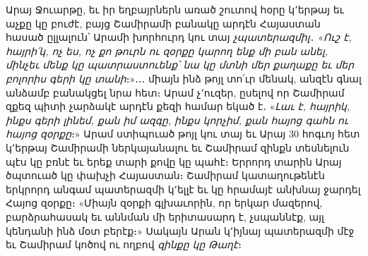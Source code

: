 \documentclass{article}
\begin{document}
{Արայ Ջուարթը, եւ իր եղբայրներն առած շուտով հօրը կ՚երթայ եւ աչքը կը բուժէ, բայց Շամիրամի բանակը արդէն Հայաստան հասած ըլլալուն՝ Արամի խորհուրդ կու տայ \emph{չպատերազմիլ}․ «\emph{Ուշ է, հայրի՛կ, ոչ ես, ոչ քո թուրն ու զօրքը կարող ենք մի բան անել, մինչեւ մենք կը պատրաստուենք՝ նա կը մտնի մեր քաղաքը եւ մեր բոլորիս գերի կը տանի}։»․․․ միայն ինձ թոյլ տո՛ւր մենակ, անզէն գնալ անձամբ բանակցել նրա հետ։ Արամ չ՚ուզեր, ըսելով որ Շամիրամ զքեզ պիտի չարձակէ արդէն քեզի համար եկած է․ «\emph{Լաւ է, հայրիկ, ինքս գերի լինեմ, քան իմ ազգը, ինքս կորչիմ, քան հայոց գահն ու հայոց զօրքը}։» Արամ ստիպուած թոյլ կու տայ եւ Արայ 30 հոգւոյ հետ կ՚երթայ Շամիրամի ներկայանալու եւ Շամիրամ զինքն տեսնելուն պէս կը բռնէ եւ երեք տարի քովը կը պահէ։ Երրորդ տարին Արայ ծպտուած կը փախչի Հայաստան։ Շամիրամ կատաղութենէն երկրորդ անգամ պատերազմի կ՚ելլէ եւ կը հրամայէ անխնայ ջարդել Հայոց զօրքը։ «Միայն զօրքի գլխաւորին, որ երկար մազերով, բարձրահասակ եւ աննման մի երիտասարդ է, չսպաննէք, այլ կենդանի ինձ մօտ բերէք։» Սակայն Արան կ՚իյնայ պատերազմի մէջ եւ Շամիրամ կոծով ու ողբով \emph{զինքը կը Թաղէ}։

}
\end{document}
